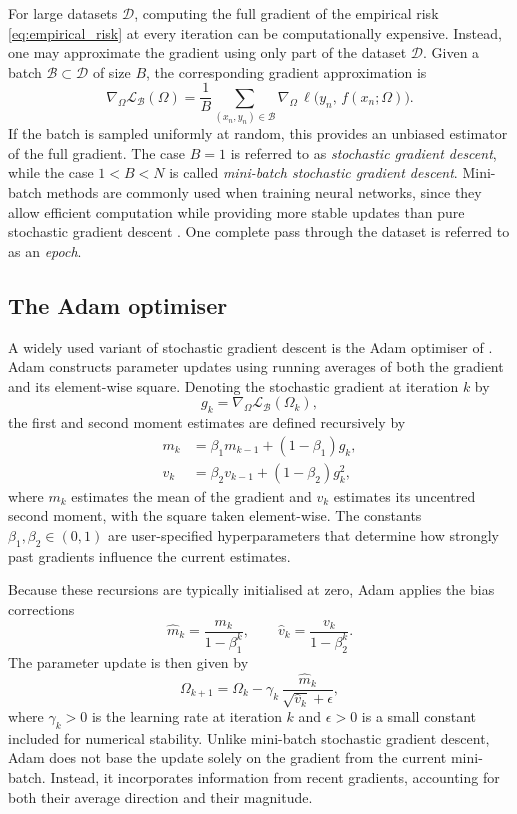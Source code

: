For large datasets $\mathcal{D}$, computing the full gradient of the empirical risk \eqref{eq:empirical_risk} at every iteration can be computationally expensive. Instead, one may approximate the gradient using only part of the dataset $\mathcal{D}$. Given a batch $\mathcal{B} \subset \mathcal{D}$ of size $B$, the corresponding gradient approximation is
\begin{equation}
    \nabla_\Omega \mathcal{L}_{\mathcal{B}}(\Omega)
    =
    \frac{1}{B}
    \sum_{(x_n,y_n)\in\mathcal{B}}
    \nabla_\Omega\,\ell\bigl(y_n,\, f(x_n;\Omega)\bigr).
\label{eq:minibatch_grad}
\end{equation}
If the batch is sampled uniformly at random, this provides an unbiased estimator of the full gradient. The case $B=1$ is referred to as \emph{stochastic gradient descent}, while the case $1 < B < N$ is called \emph{mini-batch stochastic gradient descent}. Mini-batch methods are commonly used when training neural networks, since they allow efficient computation while providing more stable updates than pure stochastic gradient descent \citep[Ch.~8]{Goodfellow2016}. One complete pass through the dataset is referred to as an \emph{epoch}.

\subsection{The Adam optimiser}
\label{subsec:adam}

A widely used variant of stochastic gradient descent is the Adam optimiser of \citet{Kingma2015}. Adam constructs parameter updates using running averages of both the gradient and its element-wise square. Denoting the stochastic gradient at iteration $k$ by
\[
    g_k = \nabla_\Omega \mathcal{L}_{\mathcal{B}}(\Omega_k),
\]
the first and second moment estimates are defined recursively by
\begin{align}
    m_k &= \beta_1 m_{k-1} + (1-\beta_1) g_k, \\
    v_k &= \beta_2 v_{k-1} + (1-\beta_2) g_k^2,
\end{align}
where $m_k$ estimates the mean of the gradient and $v_k$ estimates its uncentred second moment, with the square taken element-wise. The constants $\beta_1,\beta_2 \in (0,1)$ are user-specified hyperparameters that determine how strongly past gradients influence the current estimates.

Because these recursions are typically initialised at zero, Adam applies the bias corrections
\[
    \hat{m}_k = \frac{m_k}{1-\beta_1^k},
    \qquad
    \hat{v}_k = \frac{v_k}{1-\beta_2^k}.
\]
The parameter update is then given by
\begin{equation}
    \Omega_{k+1}
    =
    \Omega_k
    -
    \gamma_k\,
    \frac{\hat{m}_k}{\sqrt{\hat{v}_k}+\epsilon},
\label{eq:adam}
\end{equation}
where $\gamma_k > 0$ is the learning rate at iteration $k$ and $\epsilon > 0$ is a small constant included for numerical stability. Unlike mini-batch stochastic gradient descent, Adam does not base the update solely on the gradient from the current mini-batch. Instead, it incorporates information from recent gradients, accounting for both their average direction and their magnitude.


